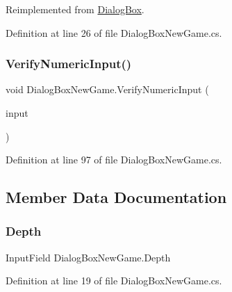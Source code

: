 Reimplemented from \hyperlink{class_dialog_box_a971a6e45f6ca26863c3910680521b0ac}{Dialog\+Box}.



Definition at line 26 of file Dialog\+Box\+New\+Game.\+cs.

\mbox{\label{class_dialog_box_new_game_aba8966a8a4189ca053113e6076272519}} 
\subsubsection{\texorpdfstring{Verify\+Numeric\+Input()}{VerifyNumericInput()}}
{\footnotesize\ttfamily void Dialog\+Box\+New\+Game.\+Verify\+Numeric\+Input (\begin{DoxyParamCaption}\item[{Input\+Field}]{input }\end{DoxyParamCaption})}



Definition at line 97 of file Dialog\+Box\+New\+Game.\+cs.



\subsection{Member Data Documentation}
\mbox{\label{class_dialog_box_new_game_acf425662878824539f86bafd516af793}} 
\subsubsection{\texorpdfstring{Depth}{Depth}}
{\footnotesize\ttfamily Input\+Field Dialog\+Box\+New\+Game.\+Depth}



Definition at line 19 of file Dialog\+Box\+New\+Game.\+cs.

\mbox{\label{class_dialog_box_new_game_a2258f936bcc36abe1ab99d1e661cc750}} 
